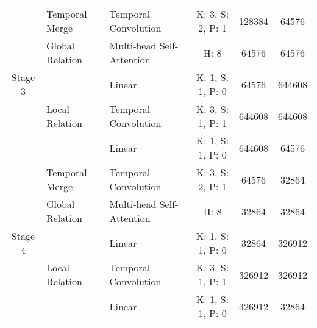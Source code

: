 \documentclass[10pt,twocolumn,letterpaper]{article}
\begin{document}
\begin{table*}[h!]
\begin{tabular}{c|l|l|c|c|c}
\multirow{5}{*}{Stage 3}                      & Temporal Merge                      & Temporal Convolution           & K: 3, S: 2, P: 1 & 128384  & 64576   \\ \cline{2-6} 
                                              & Global Relation                 & Multi-head Self-Attention & H: 8             & 64576   & 64576   \\ \cline{2-6} 
                                              & \multirow{3}{*}{Local Relation} & Linear               & K: 1, S: 1, P: 0 & 64576   & 644608  \\ &                                 & Temporal Convolution           & K: 3, S: 1, P: 1 & 644608  & 644608  \\ &                                 & Linear               & K: 1, S: 1, P: 0 & 644608  & 64576   \\ \hline
\multirow{5}{*}{Stage 4}                      & Temporal Merge                      & Temporal Convolution           & K: 3, S: 2, P: 1 & 64576   & 32864   \\ \cline{2-6} 
                                              & Global Relation                 & Multi-head Self-Attention & H: 8             & 32864   & 32864   \\ \cline{2-6} 
                                              & \multirow{3}{*}{Local Relation} & Linear               & K: 1, S: 1, P: 0 & 32864   & 326912  \\
                                              &                                 & Temporal Convolution           & K: 3, S: 1, P: 1 & 326912  & 326912  \\
                                              &                                 & Linear               & K: 1, S: 1, P: 0 & 326912  & 32864  \\ \hline
\end{tabular}
\end{table*}
\end{document}
